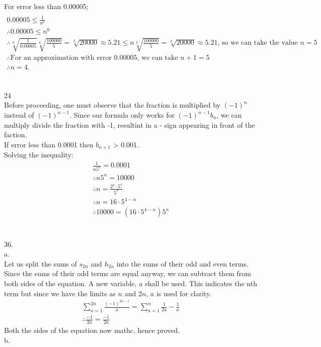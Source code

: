 \documentclass{article}
\begin{document}
\\For error less than 0.00005;
\begin{gather*}
\\0.00005\leq\frac{1}{n^6}
\\\therefore 0.00005\leq n^{6}
\\\therefore \sqrt[6]{\frac{1}{0.00005}}\sqrt[6]{\frac{100000}{5}}=\sqrt[6]{20000}\approx 5.21\leq n\sqrt[6]{\frac{100000}{5}}=\sqrt[6]{20000}\approx 5.21\text{, so we can take the value }n=5
\\\therefore \text{For an approximation with error 0.00005, we can take }n+1=5
\\\therefore n=4.
\end{gather*}
\\\\24
\\Before proceeding, one must observe that the fraction is multiplied by $(-1)^n$ instead of $(-1)^{n-1}$. Since our formula only works for $(-1)^{n-1}b_n$, we can multiply divide the fraction with -1, resultint in a - sign appearing in front of the faction.
\\If error less than 0.0001 then $b_{n+1}$ >
 0.001.
\\Solving the inequality:
\begin{gather*}
\frac{1}{n5^n}=0.0001
\\\therefore n5^n=10000
\\\therefore n=\frac{2^4\cdot 5^4}{5^n}
\\\therefore n=16\cdot 5^{4-n}
\\\therefore 10000=(16\cdot 5^{4-n})5^n
\end{gather*}
\\
\\36.
\\a.
\\Let us split the sums of $s_{2n}$ and $h_{2n}$ into the sums of their odd and even terms. Since the sums of their odd terms are equal anyway, we can subtract them from both sides of the equation. A new variable, $a$ shall be used. This indicates the nth term but since we have the limits as $n$ and $2n$, $a$ is used for clarity.
\begin{gather*}
\sum^{2n}_{a=1}\frac{(-1)^{2a-1}}{a}=\sum^{n}_{a=1}\frac{1}{2a}-\frac{1}{a}
\\\therefore \frac{-1}{2a}=\frac{-1}{2a}
\end{gather*}
Both the sides of the equation now mathc, hence proved.
\\b.
\\
\end{document}
